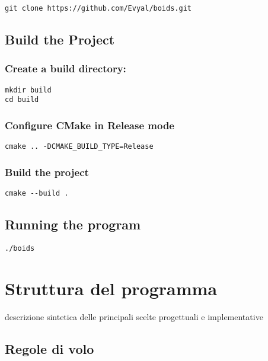 \documentclass[12pt,a4paper]{article}
\begin{document}
\begin{lstlisting}
git clone https://github.com/Evyal/boids.git
\end{lstlisting}

\subsection{Build the Project}

    
\subsubsection{Create a build directory:}

\begin{lstlisting}
mkdir build
cd build
\end{lstlisting}

\subsubsection{Configure CMake in Release mode}

\begin{lstlisting}
cmake .. -DCMAKE_BUILD_TYPE=Release
\end{lstlisting}

\subsubsection{Build the project} 

\begin{lstlisting}
cmake --build .
\end{lstlisting}

\subsection{Running the program} 

\begin{lstlisting}
./boids
\end{lstlisting}

\section{Struttura del programma}
descrizione sintetica delle principali scelte progettuali e implementative

\subsection{Regole di volo}
\end{document}
